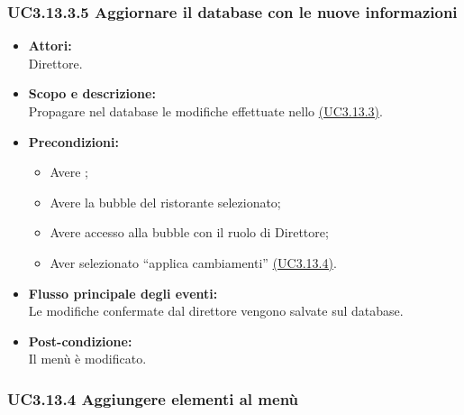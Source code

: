 \subsubsection{UC3.13.3.5 Aggiornare il database con le nuove informazioni} \label{UC3.13.3.5}

\begin{itemize}
	\item \textbf{Attori:}
	\\Direttore.
	\item \textbf{Scopo e descrizione:} 
	\\Propagare nel database le modifiche effettuate nello \hyperref[UC3.13.3]{(UC3.13.3)}.
	\item \textbf{Precondizioni:}
	\begin{itemize}
		\item Avere ;
		\item Avere la bubble del ristorante selezionato;
		\item Avere accesso alla bubble con il ruolo di Direttore;
		\item Aver selezionato “applica cambiamenti” \hyperref[UC3.13.4]{(UC3.13.4)}.
	\end{itemize}
	\item \textbf{Flusso principale degli eventi:}
	\\Le modifiche confermate dal direttore vengono salvate sul database.
	\item \textbf{Post-condizione:}
	\\Il menù è modificato.
\end{itemize}

\subsubsection{UC3.13.4 Aggiungere elementi al menù} \label{UC3.13.4}


